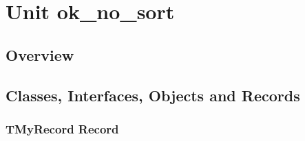 \documentclass{report}
\newif\ifpdf
\begin{document}
\label{toc}\tableofcontents
\newpage
\newlength{\tmplength}
\chapter{Unit ok{\_}no{\_}sort}
\label{ok_no_sort}
\section{Overview}
\begin{description}
\item[\texttt{\begin{ttfamily}TMyRecord\end{ttfamily} Record}]
\item[\texttt{\begin{ttfamily}TMyClass\end{ttfamily} Class}]
\end{description}
\section{Classes, Interfaces, Objects and Records}
\ifpdf
\subsection*{\large{\textbf{TMyRecord Record}}\normalsize\hspace{1ex}\hrulefill}
\else
\subsection*{TMyRecord Record}
\fi
\label{ok_no_sort.TMyRecord}
\end{document}
